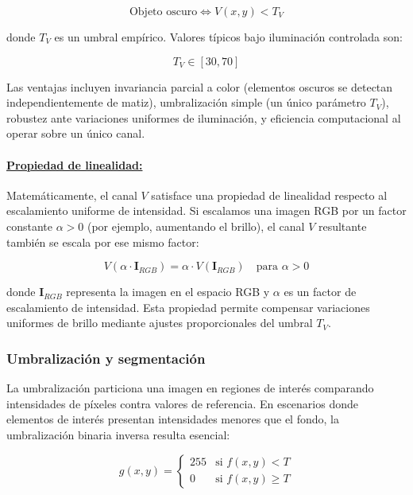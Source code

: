 \begin{equation}
\text{Objeto oscuro} \Leftrightarrow V(x,y) < T_V
\end{equation}

donde $T_V$ es un umbral empírico. Valores típicos bajo iluminación controlada son:

\begin{equation}
T_V \in [30, 70]
\end{equation}

Las ventajas incluyen invariancia parcial a color (elementos oscuros se detectan independientemente de matiz), umbralización simple (un único parámetro $T_V$), robustez ante variaciones uniformes de iluminación, y eficiencia computacional al operar sobre un único canal.

\paragraph{\underline{Propiedad de linealidad:}} Matemáticamente, el canal $V$ satisface una propiedad de linealidad respecto al escalamiento uniforme de intensidad. Si escalamos una imagen RGB por un factor constante $\alpha > 0$ (por ejemplo, aumentando el brillo), el canal $V$ resultante también se escala por ese mismo factor:

\begin{equation}
V(\alpha \cdot \mathbf{I}_{RGB}) = \alpha \cdot V(\mathbf{I}_{RGB}) \quad \text{para } \alpha > 0
\end{equation}

donde $\mathbf{I}_{RGB}$ representa la imagen en el espacio RGB y $\alpha$ es un factor de escalamiento de intensidad. Esta propiedad permite compensar variaciones uniformes de brillo mediante ajustes proporcionales del umbral $T_V$.

\subsubsection{Umbralización y segmentación}

La umbralización particiona una imagen en regiones de interés comparando intensidades de píxeles contra valores de referencia. En escenarios donde elementos de interés presentan intensidades menores que el fondo, la umbralización binaria inversa resulta esencial:

\begin{equation}
g(x,y) = \begin{cases}
255 & \text{si } f(x,y) < T \\
0 & \text{si } f(x,y) \geq T
\end{cases}
\end{equation}

